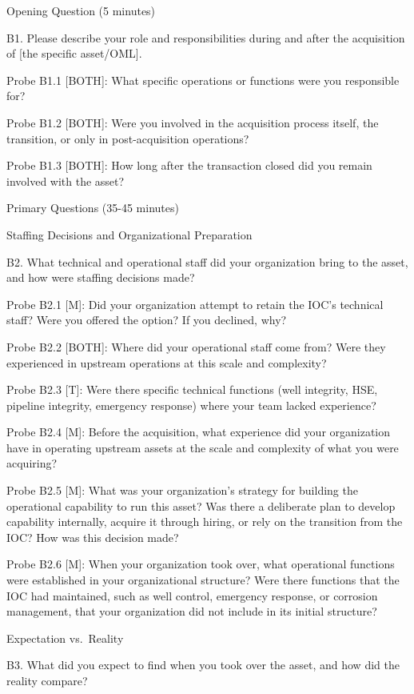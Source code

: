 \documentclass[twoside,fontset=lmodern]{mitthesis}
\begin{document}
Opening Question (5 minutes)

B1. Please describe your role and responsibilities during and after the
acquisition of {[}the specific asset/OML{]}.

Probe B1.1 {[}BOTH{]}: What specific operations or functions were you
responsible for?

Probe B1.2 {[}BOTH{]}: Were you involved in the acquisition process
itself, the transition, or only in post-acquisition operations?

Probe B1.3 {[}BOTH{]}: How long after the transaction closed did you
remain involved with the asset?

Primary Questions (35-45 minutes)

Staffing Decisions and Organizational Preparation

B2. What technical and operational staff did your organization bring to
the asset, and how were staffing decisions made?

Probe B2.1 {[}M{]}: Did your organization attempt to retain the IOC's
technical staff? Were you offered the option? If you declined, why?

Probe B2.2 {[}BOTH{]}: Where did your operational staff come from? Were
they experienced in upstream operations at this scale and complexity?

Probe B2.3 {[}T{]}: Were there specific technical functions (well
integrity, HSE, pipeline integrity, emergency response) where your team
lacked experience?

Probe B2.4 {[}M{]}: Before the acquisition, what experience did your
organization have in operating upstream assets at the scale and
complexity of what you were acquiring?

Probe B2.5 {[}M{]}: What was your organization's strategy for building
the operational capability to run this asset? Was there a deliberate
plan to develop capability internally, acquire it through hiring, or
rely on the transition from the IOC? How was this decision made?

Probe B2.6 {[}M{]}: When your organization took over, what operational
functions were established in your organizational structure? Were there
functions that the IOC had maintained, such as well control, emergency
response, or corrosion management, that your organization did not
include in its initial structure?

Expectation vs.~Reality

B3. What did you expect to find when you took over the asset, and how
did the reality compare?
\end{document}
